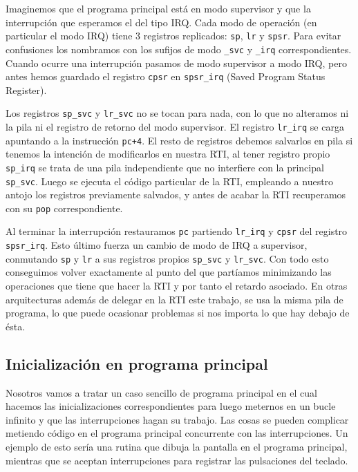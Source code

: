 Imaginemos que el programa principal está en modo supervisor y que la interrupción que
esperamos el del tipo IRQ.
Cada modo de operación (en particular el modo IRQ) tiene 3 registros replicados: {\tt sp}, {\tt lr} y {\tt spsr}.
Para evitar confusiones los nombramos con los sufijos de modo {\tt _svc} y {\tt _irq} correspondientes.
Cuando ocurre una interrupción pasamos de modo supervisor a modo IRQ, pero antes hemos guardado
el registro {\tt cpsr} en {\tt spsr_irq} (Saved Program Status Register).

Los registros {\tt sp_svc} y {\tt lr_svc} no se tocan para nada, con lo que no alteramos ni la
pila ni el registro de retorno del modo supervisor. El registro {\tt lr_irq} se carga apuntando a la
instrucción {\tt pc+4}. El resto de registros debemos salvarlos en pila si tenemos la intención
de modificarlos en nuestra RTI, al tener registro propio {\tt sp_irq} se trata de una pila
independiente que no interfiere con la principal {\tt sp_svc}. Luego se ejecuta el código
particular de la RTI, empleando a nuestro antojo los registros previamente salvados, y antes de
acabar la RTI recuperamos con su {\tt pop} correspondiente.

Al terminar la interrupción restauramos {\tt pc} partiendo {\tt lr_irq} y {\tt cpsr} del registro
{\tt spsr_irq}. Esto último fuerza un cambio de modo de IRQ a supervisor, conmutando {\tt sp} y {\tt lr}
a sus registros propios {\tt sp_svc} y {\tt lr_svc}. Con todo esto conseguimos volver exactamente
al punto del que partíamos minimizando las
operaciones que tiene que hacer la RTI y por tanto el retardo asociado. En otras arquitecturas
además de delegar en la RTI este trabajo, se usa la misma pila de programa, lo que puede
ocasionar problemas si nos importa lo que hay debajo de ésta.

\subsection{Inicialización en programa principal}

Nosotros vamos a tratar un caso sencillo de programa principal en el cual hacemos las
inicializaciones correspondientes para luego meternos en un bucle infinito y que las
interrupciones hagan su trabajo. Las cosas se pueden complicar metiendo código en
el programa principal concurrente con las interrupciones. Un ejemplo de esto sería
una rutina que dibuja la pantalla en el programa principal, mientras que se aceptan
interrupciones para registrar las pulsaciones del teclado.

